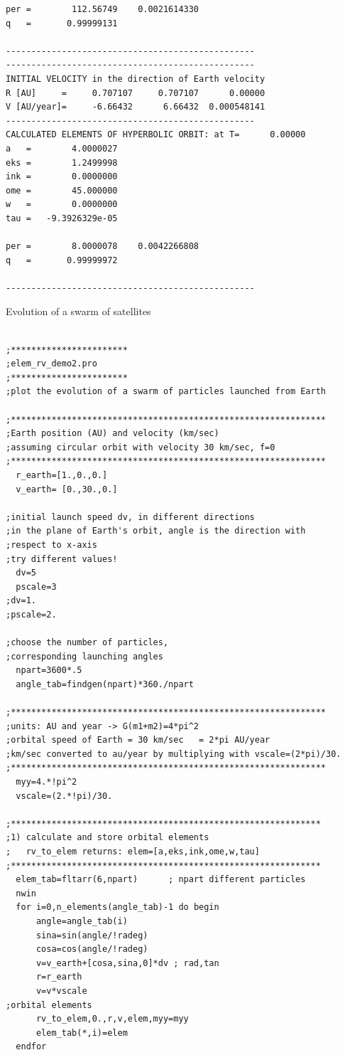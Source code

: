 \documentclass[a4paper,12pt]{article}
\def\red{\color{red}}
\def\black{\color{RGBblack}}
\begin{document}
{{{{\begin{verbatim}
per =        112.56749    0.0021614330
q   =       0.99999131

-------------------------------------------------
-------------------------------------------------
INITIAL VELOCITY in the direction of Earth velocity
R [AU]     =     0.707107     0.707107      0.00000
V [AU/year]=     -6.66432      6.66432  0.000548141
-------------------------------------------------
CALCULATED ELEMENTS OF HYPERBOLIC ORBIT: at T=      0.00000
a   =        4.0000027
eks =        1.2499998
ink =        0.0000000
ome =        45.000000
w   =        0.0000000
tau =   -9.3926329e-05

per =        8.0000078    0.0042266808
q   =       0.99999972

-------------------------------------------------
\end{verbatim}
\black}



\newpage
\black
\bul 
Evolution of a swarm of satellites  

{\red \scriptsize 
\begin{verbatim}

;***********************
;elem_rv_demo2.pro
;***********************
;plot the evolution of a swarm of particles launched from Earth

;**************************************************************
;Earth position (AU) and velocity (km/sec)
;assuming circular orbit with velocity 30 km/sec, f=0
;**************************************************************
  r_earth=[1.,0.,0.]
  v_earth= [0.,30.,0.]

;initial launch speed dv, in different directions
;in the plane of Earth's orbit, angle is the direction with 
;respect to x-axis
;try different values!
  dv=5
  pscale=3
;dv=1.
;pscale=2.

;choose the number of particles,
;corresponding launching angles
  npart=3600*.5
  angle_tab=findgen(npart)*360./npart

;**************************************************************
;units: AU and year -> G(m1+m2)=4*pi^2
;orbital speed of Earth = 30 km/sec   = 2*pi AU/year
;km/sec converted to au/year by multiplying with vscale=(2*pi)/30.
;**************************************************************
  myy=4.*!pi^2
  vscale=(2.*!pi)/30.

;*************************************************************
;1) calculate and store orbital elements
;   rv_to_elem returns: elem=[a,eks,ink,ome,w,tau]
;*************************************************************
  elem_tab=fltarr(6,npart)      ; npart different particles
  nwin
  for i=0,n_elements(angle_tab)-1 do begin
      angle=angle_tab(i)
      sina=sin(angle/!radeg)
      cosa=cos(angle/!radeg)
      v=v_earth+[cosa,sina,0]*dv ; rad,tan
      r=r_earth
      v=v*vscale
;orbital elements
      rv_to_elem,0.,r,v,elem,myy=myy
      elem_tab(*,i)=elem
  endfor


\end{verbatim}}}}}
\end{document}
